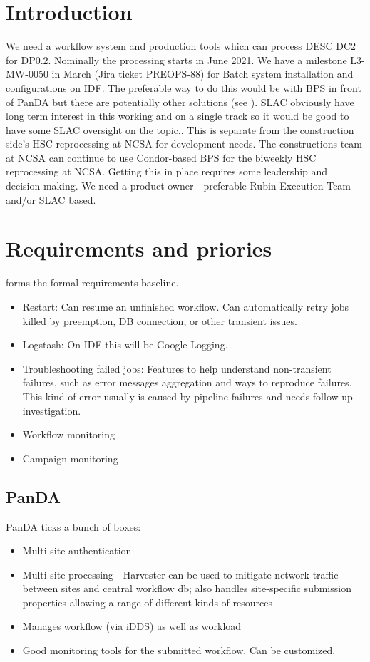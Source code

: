 \section{Introduction}

We need a workflow system and production tools which can process DESC DC2 for DP0.2. Nominally the processing starts in June 2021.
We have a milestone L3-MW-0050 in March (Jira ticket PREOPS-88) for Batch system installation and configurations on IDF.
The preferable way to do this would be with BPS in front of PanDA but there are potentially other solutions (see ).
SLAC obviously have long term interest in this working and on a single track so it would be good to have some SLAC oversight on the topic..
This is separate from the construction side's HSC reprocessing at NCSA for development needs. The  constructions team at NCSA can continue to use Condor-based BPS for the biweekly HSC reprocessing at NCSA.
Getting this in place requires some leadership and decision making. We need a product owner - preferable Rubin Execution Team and/or SLAC based.



\section {Requirements and priories}
 forms the formal requirements baseline.

\begin{itemize}
\item Restart: Can resume an unfinished workflow. Can automatically retry jobs killed by preemption, DB connection, or other transient issues.
\item Logstash: On IDF this will be Google Logging.
\item Troubleshooting failed jobs: Features to help understand non-transient failures, such as error messages aggregation and ways to reproduce failures. This kind of error usually is caused by pipeline failures and needs follow-up investigation.
\item Workflow monitoring
\item Campaign monitoring
\end{itemize}

\subsection{PanDA}
PanDA ticks a bunch of boxes:
\begin{itemize}
\item Multi-site authentication
\item Multi-site processing - Harvester can be used to mitigate network traffic between sites and central workflow db; also handles site-specific submission properties allowing a range of different kinds of resources
\item Manages workflow (via iDDS) as well as workload
\item Good monitoring tools for the submitted workflow. Can be customized.
\end{itemize}

